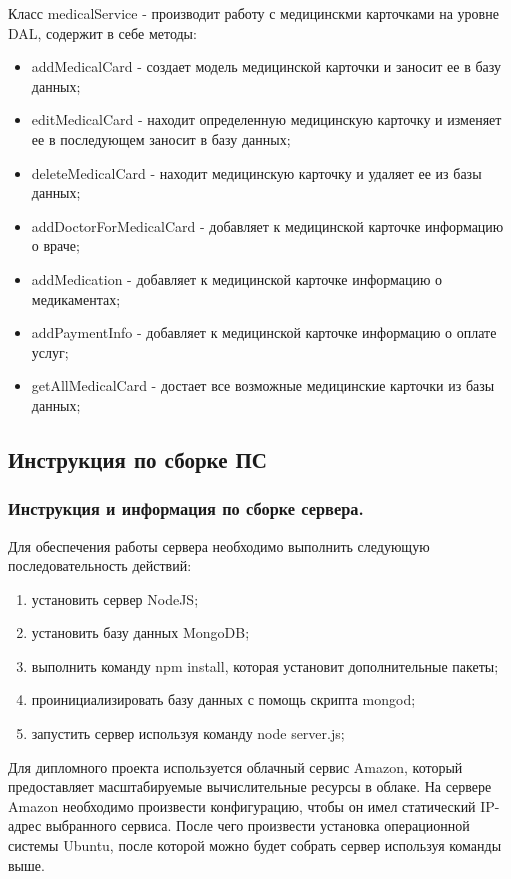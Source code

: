 Класс medicalService - производит работу с медицинскми карточками на уровне DAL, содержит в себе методы:
\begin{itemize}
  \item addMedicalCard - создает модель медицинской карточки и заносит ее в базу данных;
  \item editMedicalCard - находит определенную медицинскую карточку и изменяет ее в последующем заносит в базу данных;
  \item deleteMedicalCard - находит медицинскую карточку и удаляет ее из базы данных;
  \item addDoctorForMedicalCard - добавляет к медицинской карточке информацию о враче;
  \item addMedication - добавляет к медицинской карточке информацию о медикаментах;
  \item addPaymentInfo - добавляет к медицинской карточке информацию о оплате услуг;
  \item getAllMedicalCard - достает все возможные медицинские карточки из базы данных;
\end{itemize}

\subsection{Инструкция по сборке ПС}
\label{sub:arch_and_mod:sbor}

\subsubsection{Инструкция и информация по сборке сервера. }


Для обеспечения работы сервера необходимо выполнить следующую последовательность действий:
\begin{enumerate}
\item установить сервер NodeJS;
\item установить базу данных MongoDB;
\item выполнить команду npm install, которая установит дополнительные пакеты;
\item проинициализировать базу данных с помощь скрипта mongod;
\item запустить сервер используя команду node server.js;
\end{enumerate}

Для дипломного проекта используется облачный сервис Amazon, который предоставляет масштабируемые вычислительные ресурсы в облаке. На сервере Amazon необходимо произвести конфигурацию, чтобы он имел статический IP-адрес выбранного сервиса. После чего произвести установка операционной системы Ubuntu, после которой можно будет собрать сервер используя команды выше.

